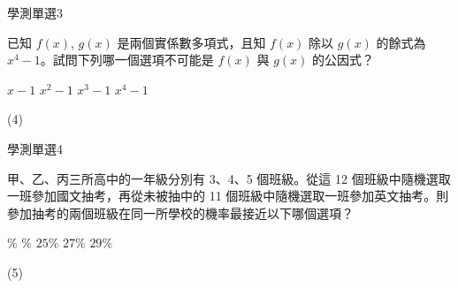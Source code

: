     \begin{QUESTION}
        \begin{ExamInfo}{98}{學測}{單選}{3}
        \end{ExamInfo}
        \begin{ExamAnsRateInfo}{27}{39}{25}{17}
        \end{ExamAnsRateInfo}
        \begin{QBODY}
            已知 $f(x)$, $g(x)$ 是兩個實係數多項式，且知 $f(x)$ 除以 $g(x)$ 的餘式為 $x^4 -1$。試問下列哪一個選項不可能是 $f(x)$ 與 $g(x)$ 的公因式？ 
			\begin{QOPS} 
				\QOP $x-1$ 
				\QOP $x^2-1$ 
				\QOP $x^3-1$ 
				\QOP $x^4-1$
			\end{QOPS}
        \end{QBODY}
        \begin{QFROMS}
        \end{QFROMS}
        \begin{QTAGS}\end{QTAGS}
        \begin{QANS}
            (4)
        \end{QANS}
        \begin{QSOLLIST}
        \end{QSOLLIST}
        \begin{QEMPTYSPACE}
        \end{QEMPTYSPACE}
    \end{QUESTION}
    \begin{QUESTION}
        \begin{ExamInfo}{98}{學測}{單選}{4}
        \end{ExamInfo}
        \begin{ExamAnsRateInfo}{42}{80}{38}{8}
        \end{ExamAnsRateInfo}
        \begin{QBODY}
            甲、乙、丙三所高中的一年級分別有 3、4、5 個班級。從這 12 個班級中隨機選取一班參加國文抽考，再從未被抽中的 11 個班級中隨機選取一班參加英文抽考。則參加抽考的兩個班級在同一所學校的機率最接近以下哪個選項？
			\begin{QOPS} 
				\QOP 21 $\%$  
				\QOP 23$\%$ 
				\QOP $25\%$ 
				\QOP $27\%$  
				\QOP $29\%$
			\end{QOPS}
        \end{QBODY}
        \begin{QFROMS}
        \end{QFROMS}
        \begin{QTAGS}\end{QTAGS}
        \begin{QANS}
            (5)
        \end{QANS}
        \begin{QSOLLIST}
        \end{QSOLLIST}
        \begin{QEMPTYSPACE}
        \end{QEMPTYSPACE}
    \end{QUESTION}
